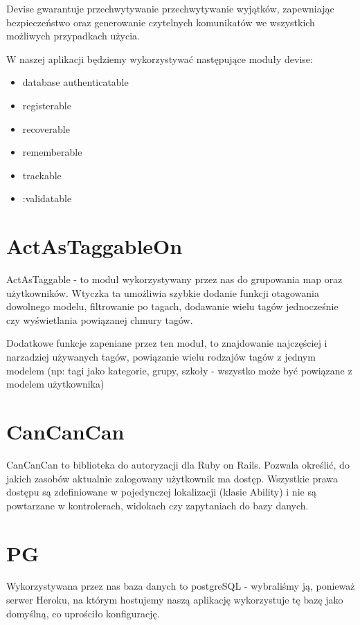Devise gwarantuje przechwytywanie przechwytywanie wyjątków, zapewniając bezpieczeństwo oraz generowanie czytelnych komunikatów we wszystkich możliwych przypadkach użycia.


W naszej aplikacji będziemy wykorzystywać następujące moduły devise:

\begin{itemize}
\item database authenticatable
\item registerable
\item recoverable
\item rememberable
\item trackable
\item :validatable
\end{itemize}

\section{ActAsTaggableOn}
ActAsTaggable - to moduł wykorzystywany przez nas do grupowania map oraz użytkowników. Wtyczka ta umożliwia szybkie dodanie funkcji otagowania dowolnego modelu, filtrowanie po tagach, dodawanie wielu tagów jednocześnie czy wyświetlania powiązanej chmury tagów.

Dodatkowe funkcje zapeniane przez ten moduł, to znajdowanie najczęściej i narzadziej używanych tagów, powiązanie wielu rodzajów tagów z jednym modelem (np: tagi jako kategorie, grupy, szkoły - wszystko może być powiązane z modelem użytkownika)

\section{CanCanCan}

CanCanCan to biblioteka do autoryzacji dla Ruby on Rails. Pozwala określić, do jakich zasobów aktualnie zalogowany użytkownik ma dostęp. Wszystkie prawa dostępu są zdefiniowane w pojedynczej lokalizacji (klasie Ability) i nie są powtarzane w kontrolerach, widokach czy zapytaniach do bazy danych.

\section{PG}

Wykorzystywana przez nas baza danych to postgreSQL - wybraliśmy ją, ponieważ serwer Heroku, na którym hostujemy naszą aplikację wykorzystuje tę bazę jako domyślną, co uprościło konfigurację.

